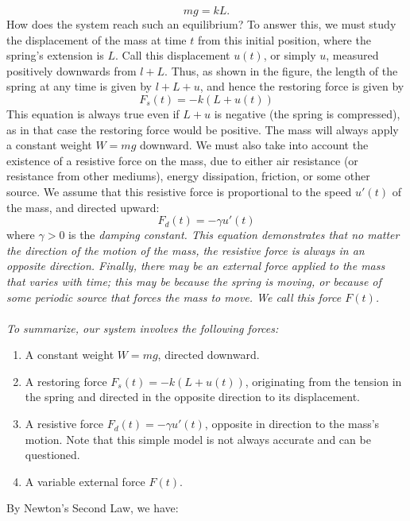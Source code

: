 \documentclass{article}
\begin{document}
\begin{equation*}
    mg = kL.
\end{equation*}
How does the system reach such an equilibrium? To answer this, we must study the displacement of the mass at time $t$ from this initial position, where the spring's extension is $L$. Call this displacement $u(t)$, or simply $u$, measured positively downwards from $l+L$. Thus, as shown in the figure, the length of the spring at any time is given by $l + L + u$, and hence the restoring force is given by 
\begin{equation*}
    F_s(t) = -k(L+u(t))
\end{equation*}
This equation is always true even if $L+u$ is negative (the spring is compressed), as in that case the restoring force would be positive. The mass will always apply a constant weight $W=mg$ downward. We must also take into account the existence of a resistive force on the mass, due to either air resistance (or resistance from other mediums), energy dissipation, friction, or some other source. We assume that this resistive force is proportional to the speed $u'(t)$ of the mass, and directed upward:
\begin{equation*}
    F_d(t) = -\gamma u'(t)
\end{equation*}
where $\gamma > 0$ is the \it damping constant\normalfont. This equation demonstrates that no matter the direction of the motion of the mass, the resistive force is always in an opposite direction. Finally, there may be an external force applied to the mass that varies with time; this may be because the spring is moving, or because of some periodic source that forces the mass to move. We call this force $F(t)$. \\ \\
To summarize, our system involves the following forces:
\begin{enumerate}
    \item A constant weight $W=mg$, directed downward.
    \item A restoring force $F_s(t) = -k(L+u(t))$, originating from the tension in the spring and directed in the opposite direction to its displacement.
    \item A resistive force $F_d(t) = -\gamma u'(t)$, opposite in direction to the mass's motion. Note that this simple model is not always accurate and can be questioned.
    \item A variable external force $F(t)$.
\end{enumerate}
By Newton's Second Law, we have:
\end{document}
